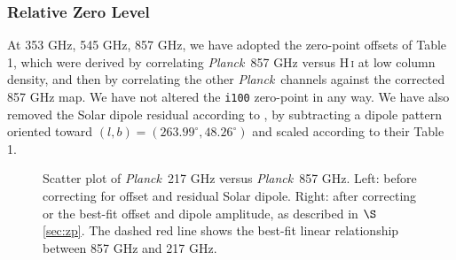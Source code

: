 \documentclass{emulateapj}
\newcommand{\PLANCK}{{\it Planck}}
\begin{document}







\subsubsection{Relative Zero Level}

At 353 GHz, 545 GHz, 857 GHz, we have 
adopted the zero-point offsets of \cite{planckdust} Table 1, which were derived
 by correlating \PLANCK~857 GHz versus H\,\textsc{i} at low column density, and
then by correlating the other \PLANCK~channels against the corrected 857 GHz 
map. We have not altered the \verb|i100| zero-point in any way. We have also 
removed the Solar dipole residual according to \cite{planckdust}, by 
subtracting a dipole pattern oriented toward 
$(l, b) = (263.99^{\circ}, 48.26^{\circ})$ and scaled according to their 
Table 1.

\begin{figure}
\begin{center}
\caption{\label{fig:scatter} Scatter plot of \PLANCK~217 GHz versus \PLANCK~857
GHz. Left: before correcting for offset and residual Solar dipole. Right: after
correcting or the best-fit offset and dipole amplitude, as described in 
$\S$\ref{sec:zp}. The dashed red line shows the best-fit linear relationship
between 857 GHz and 217 GHz.}
\end{center}
\end{figure}
\end{document}
